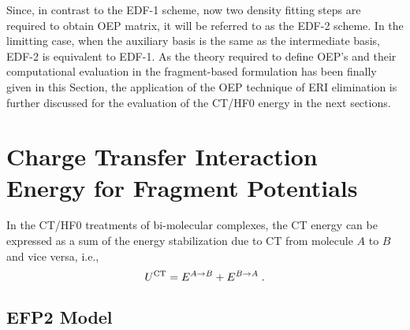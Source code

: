 \documentclass[aip,jcp,amsmath,amssymb,reprint,floatfix]{revtex4-1}
\begin{document}
Since, in contrast to the EDF-1 scheme, now two density fitting steps are required to
obtain OEP matrix, it will be referred to as the EDF-2 scheme.
In the limitting case, when the auxiliary basis is the same as the intermediate basis,
EDF-2 is equivalent to EDF-1.
As the theory required to define OEP's and their computational
evaluation in the fragment\hyp{}based formulation has been finally given in this Section,
the application of the OEP technique of ERI elimination is
further discussed for the evaluation of the CT/HF0 energy in the next sections.


\section{\label{s:3.ct}Charge Transfer Interaction Energy for Fragment Potentials}

In the CT/HF0 treatments of bi\hyp{}molecular complexes, the CT energy
can be expressed as a sum of the energy stabilization due to 
CT from molecule $A$ to $B$ and vice versa, i.e.,
%
\begin{equation} \label{e:ct-hf0}
 U^{\rm CT} =  E^{A\rightarrow B} + E^{B\rightarrow A}\;.
\end{equation}
%

\subsection{\label{ss:3.1.EFP2} EFP2 Model}
\end{document}
